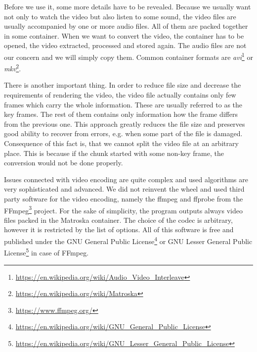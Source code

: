 Before we use it, some more details have to be revealed. Because we usually want not only to watch the video but also listen to some sound, the video files are usually accompanied by one or more audio files. All of them are packed together in some container. When we want to convert the video, the container has to be opened, the video extracted, processed and stored again. The audio files are not our concern and we will simply copy them. Common container formats are \textit{avi}\footnote{\url{https://en.wikipedia.org/wiki/Audio\_Video\_Interleave}} or \textit{mkv}\footnote{\url{https://en.wikipedia.org/wiki/Matroska}}.

There is another important thing. In order to reduce file size and decrease the requirements of rendering the video, the video file actually contains only few frames which carry the whole information. These are usually referred to as the key frames. The rest of them contains only information how the frame differs from the previous one. This approach greatly reduces the file size and preserves good ability to recover from errors, e.g. when some part of the file is damaged. Consequence of this fact is, that we cannot split the video file at an arbitrary place. This is because if the chunk started with some non-key frame, the conversion would not be done properly.

Issues connected with video encoding are quite complex and used algorithms are very sophisticated and advanced. We did not reinvent the wheel and used third party software for the video encoding, namely the ffmpeg and ffprobe from the FFmpeg\footnote{\url{https://www.ffmpeg.org/}} project. For the sake of simplicity, the program outputs always video files packed in the Matroska container. The choice of the codec is arbitrary, however it is restricted by the list of options. All of this software is free and published under the GNU General Public License\footnote{\url{https://en.wikipedia.org/wiki/GNU\_General\_Public\_License}} or GNU Lesser General Public License\footnote{\url{https://en.wikipedia.org/wiki/GNU\_Lesser\_General\_Public\_License}} in case of FFmpeg.

